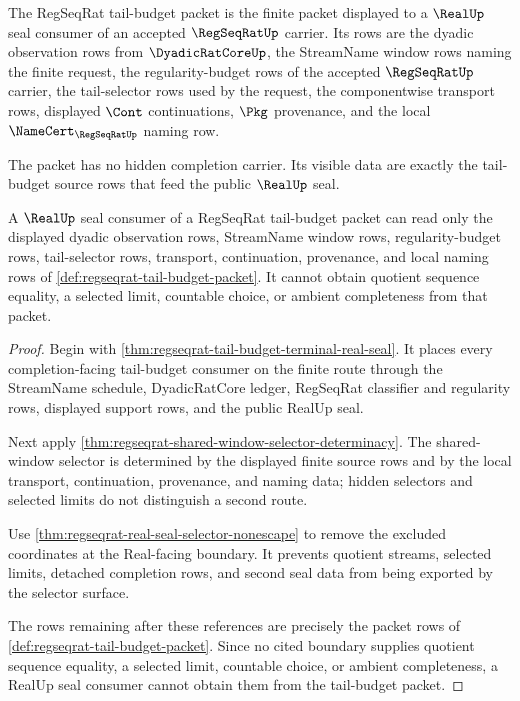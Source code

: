 \begin{definition}
\label{def:regseqrat-tail-budget-packet}
The RegSeqRat tail-budget packet is the finite packet displayed to a $\RealUp$ seal consumer of an accepted $\RegSeqRatUp$ carrier. Its rows are the dyadic observation rows from $\DyadicRatCoreUp$, the StreamName window rows naming the finite request, the regularity-budget rows of the accepted $\RegSeqRatUp$ carrier, the tail-selector rows used by the request, the componentwise transport rows, displayed $\Cont$ continuations, $\Pkg$ provenance, and the local $\NameCert_{\RegSeqRatUp}$ naming row.

The packet has no hidden completion carrier. Its visible data are exactly the tail-budget source rows that feed the public $\RealUp$ seal.
\end{definition}

\begin{theorem}
\label{thm:regseqrat-tail-budget-nonescape}
A $\RealUp$ seal consumer of a RegSeqRat tail-budget packet can read only the displayed dyadic observation rows, StreamName window rows, regularity-budget rows, tail-selector rows, transport, continuation, provenance, and local naming rows of \autoref{def:regseqrat-tail-budget-packet}. It cannot obtain quotient sequence equality, a selected limit, countable choice, or ambient completeness from that packet.
\end{theorem}
\begin{proof}
Begin with \autoref{thm:regseqrat-tail-budget-terminal-real-seal}. It places every completion-facing tail-budget consumer on the finite route through the StreamName schedule, DyadicRatCore ledger, RegSeqRat classifier and regularity rows, displayed support rows, and the public RealUp seal.

Next apply \autoref{thm:regseqrat-shared-window-selector-determinacy}. The shared-window selector is determined by the displayed finite source rows and by the local transport, continuation, provenance, and naming data; hidden selectors and selected limits do not distinguish a second route.

Use \autoref{thm:regseqrat-real-seal-selector-nonescape} to remove the excluded coordinates at the Real-facing boundary. It prevents quotient streams, selected limits, detached completion rows, and second seal data from being exported by the selector surface.

The rows remaining after these references are precisely the packet rows of \autoref{def:regseqrat-tail-budget-packet}. Since no cited boundary supplies quotient sequence equality, a selected limit, countable choice, or ambient completeness, a RealUp seal consumer cannot obtain them from the tail-budget packet.
\end{proof}

